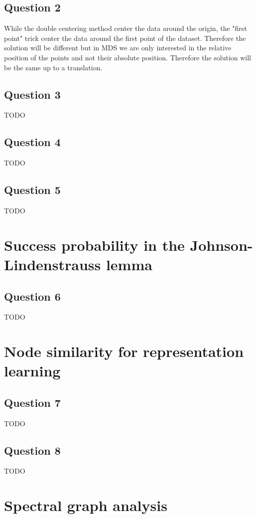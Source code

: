 \documentclass{article}
\begin{document}
\subsection{Question 2}
While the double centering method center the data around the origin, the "first point" trick center the data around the first point of the dataset. Therefore the solution will be different but in MDS we are only interested in the relative position of the points and not their absolute position. Therefore the solution will be the same up to a translation.

\subsection{Question 3}
TODO

\subsection{Question 4}
TODO

\subsection{Question 5}
TODO

\section{Success probability in the Johnson-Lindenstrauss lemma}

\subsection{Question 6}
TODO

\section{Node similarity for representation learning}

\subsection{Question 7}
TODO

\subsection{Question 8}
TODO

\section{Spectral graph analysis}
\end{document}

